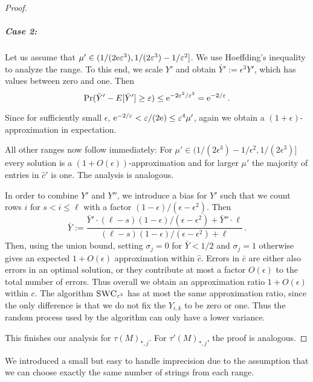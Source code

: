\begin{proof}
    \subparagraph{Case 2:} Let us assume that $\mu' \in (1/(2\textrm{e}\varepsilon^3), 1/(2\varepsilon^3) - 1/\varepsilon^2]$.
    We use Hoeffding's inequality \cite{Hoe63_probability} to analyze the range.
    To this end, we scale $Y'$ and obtain $\bar{Y}':= \epsilon^3 Y'$, which has values between zero and one.
    Then 
    \[
        \Pr(\bar{Y}' - E[\bar{Y}'] \ge \varepsilon) \le \textrm{e}^{-2\varepsilon^2/\varepsilon^3} = \textrm{e}^{-2/\varepsilon}\,.
    \]

    Since for sufficiently small $\epsilon$, $\textrm{e}^{-2/\varepsilon} < \varepsilon/(2\textrm{e}) \le \varepsilon^4 \mu'$,
    again we obtain a $(1+\epsilon)$-approximation in expectation.

    All other ranges now follow immediately:
    For $\mu' \in (1/(2\epsilon^3) - 1/\epsilon^2,1/(2\epsilon^3)]$ every solution is a $(1+O(\epsilon))$-approximation and for larger $\mu'$ the majority of entries in $\hat{c}'$ is one.
    The analysis is analogous.

    In order to combine $Y'$ and $Y''$, we introduce a bias for $Y'$ such that we count rows $i$ for $s < i \le \ell$ with a factor $(1-\epsilon)/(\epsilon - \epsilon^2)$.
    Then
    \[
        \bar{Y} := \frac{\bar{Y}' \cdot (\ell-s)(1-\epsilon)/(\epsilon - \epsilon^2) + \bar{Y}'' \cdot \ell}{(\ell-s)(1-\epsilon)/(\epsilon - \epsilon^2) + \ell}\,.
    \]
    Then, using the union bound, setting $\sigma_j = 0$ for $\bar{Y} < 1/2$ and $\sigma_j = 1$ otherwise gives an expected $1+O(\epsilon)$ approximation within $\hat{c}$.
    Errors in $\bar{c}$ are either also errors in an optimal solution, or they contribute at most a factor $O(\epsilon)$ to the total number of errors.
    Thus overall we obtain an approximation ratio $1+O(\epsilon)$ within $c$.
    The algorithm $\textsc{SWC}_{\varepsilon^3}$ has at most the same approximation ratio, since the only difference is that we do not fix the $Y_{i,k}$ to be zero or one.
    Thus the random process used by the algorithm can only have a lower variance.

    This finishes our analysis for $\tau(M)_{*,j}$.
    For $\tau'(M)_{*,j}$, the proof is analogous.

\end{proof}

We introduced a small but easy to handle imprecision due to the assumption that we can choose exactly the same number of strings from each range.



